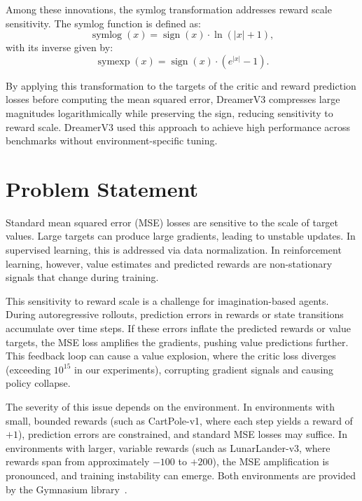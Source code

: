 Among these innovations, the symlog transformation addresses reward scale sensitivity. The symlog function is defined as:
\begin{equation}
    \operatorname{symlog}(x) = \operatorname{sign}(x) \cdot \ln(|x| + 1),
    \label{eq:symlog_intro}
\end{equation}
with its inverse given by:
\begin{equation}
    \operatorname{symexp}(x) = \operatorname{sign}(x) \cdot \left( e^{|x|} - 1 \right).
    \label{eq:symexp_intro}
\end{equation}

\noindent By applying this transformation to the targets of the critic and reward prediction losses before computing the mean squared error, DreamerV3 compresses large magnitudes logarithmically while preserving the sign, reducing sensitivity to reward scale. DreamerV3 used this approach to achieve high performance across benchmarks without environment-specific tuning.

\section{Problem Statement}
\label{sec:intro_prob_art}

Standard mean squared error (MSE) losses are sensitive to the scale of target values. Large targets can produce large gradients, leading to unstable updates. In supervised learning, this is addressed via data normalization. In reinforcement learning, however, value estimates and predicted rewards are non-stationary signals that change during training.

This sensitivity to reward scale is a challenge for imagination-based agents. During autoregressive rollouts, prediction errors in rewards or state transitions accumulate over time steps. If these errors inflate the predicted rewards or value targets, the MSE loss amplifies the gradients, pushing value predictions further. This feedback loop can cause a value explosion, where the critic loss diverges (exceeding $10^{15}$ in our experiments), corrupting gradient signals and causing policy collapse.

The severity of this issue depends on the environment. In environments with small, bounded rewards (such as CartPole-v1, where each step yields a reward of $+1$), prediction errors are constrained, and standard MSE losses may suffice. In environments with larger, variable rewards (such as LunarLander-v3, where rewards span from approximately $-100$ to $+200$), the MSE amplification is pronounced, and training instability can emerge. Both environments are provided by the Gymnasium library~\citep{towers2024gymnasium}.

